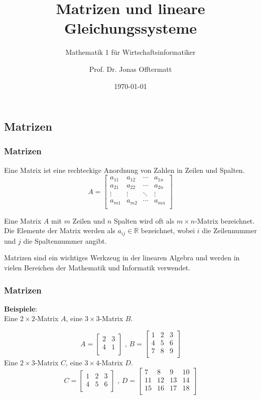 \documentclass{beamer}
\title{Matrizen und lineare Gleichungssysteme}
\subtitle{Mathematik 1 für Wirtschaftsinformatiker}
\author{Prof. Dr. Jonas Offtermatt}
\date{\today}
\begin{document}
\subsection{Matrizen}
\begin{frame}
  \frametitle{Matrizen}
  
  Eine Matrix ist eine rechteckige Anordnung von Zahlen in Zeilen und Spalten. 
  \[
A = \begin{bmatrix}
    a_{11} & a_{12} & \cdots & a_{1n} \\
    a_{21} & a_{22} & \cdots & a_{2n} \\
    \vdots & \vdots & \ddots & \vdots \\
    a_{m1} & a_{m2} & \cdots & a_{mn} \\
\end{bmatrix}
\]

  
  Eine Matrix $A$ mit $m$ Zeilen und $n$ Spalten wird oft als $m \times n$-Matrix bezeichnet. Die Elemente der Matrix werden als $a_{ij} \in \mathbb{R}$ bezeichnet, wobei $i$ die Zeilennummer und $j$ die Spaltennummer angibt.
  
  \vspace{0.3cm}
  Matrizen sind ein wichtiges
Werkzeug in der linearen Algebra und werden in vielen Bereichen
der Mathematik und Informatik verwendet.
  \end{frame}

\begin{frame}
    \frametitle{Matrizen}
  \textbf{Beispiele}:\\
   Eine $2 \times 2$-Matrix $A$, eine $3 \times 3$-Matrix $B$. 
  
  \[ 
  A = \begin{bmatrix}
    2 & 3 \\
    4 & 1 \\
  \end{bmatrix}
  \text{ , }
  B = \begin{bmatrix}
    1 & 2 & 3 \\
    4 & 5 & 6 \\
    7 & 8 & 9 \\
  \end{bmatrix}
  \]
  Eine $2 \times 3$-Matrix $C$, eine $3 \times 4$-Matrix $D$.
  \[
C = \begin{bmatrix}
    1 & 2 & 3 \\
    4 & 5 & 6 \\
\end{bmatrix}
\text{ , }
D = \begin{bmatrix}
    7 & 8 & 9 & 10 \\
    11 & 12 & 13 & 14 \\
    15 & 16 & 17 & 18 \\
\end{bmatrix}
\]
\end{frame}
\end{document}
